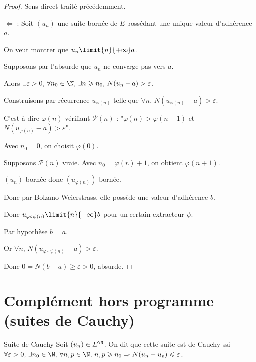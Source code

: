 
\begin{proof}
    Sens direct traité précédemment. 

    $\Leftarrow$ : Soit $(u_n)$ une suite bornée de $E$ possédant une unique valeur d'adhérence $a$.

    On veut montrer que $u_n \limit{n}{+\infty} a$.

    Supposons par l'absurde que $u_n$ ne converge pas vers $a$.

    Alors $\exists \varepsilon > 0, \, \forall n_0 \in \N, \, \exists n \geqslant n_0, \, N(u_n - a) > \varepsilon$.

    Construisons par récurrence $u_{\varphi(n)}$ telle que $\forall n, \, N(u_{\varphi(n)} - a) > \varepsilon$.

    C'est-à-dire $\varphi(n) $ vérifiant $\mathscr P(n)$ : "$\varphi(n) > \varphi(n - 1)$ et $N(u_{\varphi(n)} - a) > \varepsilon$".

    Avec $n_0 = 0$, on choisit $\varphi(0)$.

    Supposons $\mathscr P(n)$ vraie. Avec $n_0 = \varphi(n) + 1$, on obtient $\varphi(n + 1)$.

    $(u_n)$ bornée donc $(u_{\varphi(n)})$ bornée.

    Donc par Bolzano-Weierstrass, elle possède une valeur d'adhérence $b$.

    Donc $u_{\varphi \circ \psi(n)} \limit{n}{+\infty} b$ pour un certain extracteur $\psi$.

    Par hypothèse $b = a$. 

    Or $\forall n, \, N(u_{\varphi \circ \psi(n)} - a) > \varepsilon$.

    Donc $ 0 = N(b - a) \geqslant \varepsilon > 0$, absurde. 
\end{proof}

\section{Complément hors programme (suites de Cauchy)}


\begin{definition}{Suite de Cauchy}{}
    Soit $(u_n) \in E^{\N}$. On dit que cette suite est de Cauchy ssi 
    $\forall \varepsilon > 0, \, \exists n_0 \in \N, \, \forall n, p \in \N, \, n, p \geqslant n_0 \Rightarrow N(u_n - u_p) \leqslant \varepsilon$.
\end{definition}

